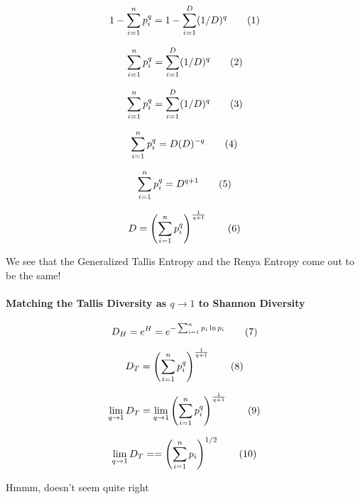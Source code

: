 \[
  1 -
  \sum_{i=1}^{n}
    p_i^q
  =
  1 -
  \sum_{i=1}^{D}
    (1/D)^q
  \addtag
\]

\[
  \sum_{i=1}^{n}
    p_i^q
  =
  \sum_{i=1}^{D}
    (1/D)^q
  \addtag
\]

\[
  \sum_{i=1}^{n}
    p_i^q
  =
  \sum_{i=1}^{D}
    (1/D)^q
  \addtag
\]

\[
  \sum_{i=1}^{n}
    p_i^q
  =
  D
  (D)^{-q}
  \addtag
\]

\[
  \sum_{i=1}^{n}
    p_i^q
  =
  D^{q + 1}
  \addtag
\]

\[
  D =
  \left(
  \sum_{i=1}^{n}
    p_i^q
  \right)^{
    \frac{1}{q + 1}
  }
  \addtag
\]

We see that the Generalized Tallis Entropy and the Renya Entropy come out to be the same!

\paragraph{Matching the Tallis Diversity as $q \to 1$ to Shannon Diversity}

\[
  D_H
  = 
  e^H
  =
  e^{
    - \sum_{i=1}^{n}
    p_i
    \ln p_i
  }
  \addtag
\]

\[
  D_T =
  \left(
  \sum_{i=1}^{n}
    p_i^q
  \right)^{
    \frac{1}{q + 1}
  }
  \addtag
\]

\[
  \lim_{q \to 1} D_T =
  \lim_{q \to 1}
  \left(
  \sum_{i=1}^{n}
    p_i^q
  \right)^{
    \frac{1}{q + 1}
  }
  \addtag
\]

\[
  \lim_{q \to 1} D_T =
  =
  \left(
  \sum_{i=1}^{n}
    p_i
  \right)^{
    1/2
  }
  \addtag
\]

Hmmm, doesn't seem quite right
